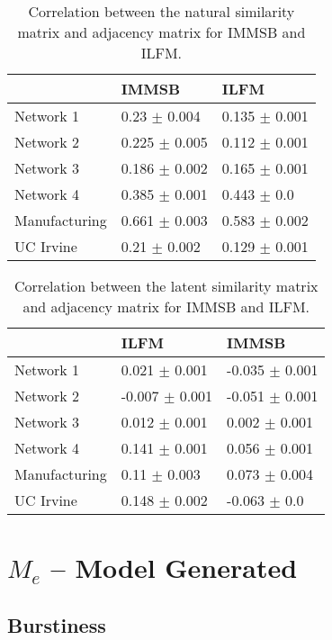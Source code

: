 \documentclass[a4paper, 12pt]{article}
\begin{document}
\begin{table}
    \caption{Correlation between the natural similarity matrix and adjacency matrix for IMMSB and ILFM.}
\centering
    \begin{tabular}{lll}
    \hline
    & IMMSB   & ILFM  \\
    \hline
    Network 1     & 0.23 $\pm$ 0.004  & 0.135 $\pm$ 0.001      \\
    Network 2     & 0.225 $\pm$ 0.005 & 0.112 $\pm$ 0.001      \\
    Network 3     & 0.186 $\pm$ 0.002 & 0.165 $\pm$ 0.001      \\
    Network 4     & 0.385 $\pm$ 0.001 & 0.443 $\pm$ 0.0        \\
    Manufacturing & 0.661 $\pm$ 0.003 & 0.583 $\pm$ 0.002      \\
    UC Irvine     & 0.21 $\pm$ 0.002  & 0.129 $\pm$ 0.001      \\
    \hline
    \end{tabular}
\end{table}


\begin{table}
    \caption{Correlation between the latent similarity matrix and adjacency matrix for IMMSB and ILFM.}
    \begin{tabular}{lll}
    \hline
    & ILFM  & IMMSB \\
    \hline
    Network 1     & 0.021 $\pm$ 0.001  & -0.035 $\pm$ 0.001      \\
    Network 2     & -0.007 $\pm$ 0.001 & -0.051 $\pm$ 0.001      \\
    Network 3     & 0.012 $\pm$ 0.001  & 0.002 $\pm$ 0.001       \\
    Network 4     & 0.141 $\pm$ 0.001  & 0.056 $\pm$ 0.001       \\
    Manufacturing & 0.11 $\pm$ 0.003   & 0.073 $\pm$ 0.004       \\
    UC Irvine     & 0.148 $\pm$ 0.002  & -0.063 $\pm$ 0.0        \\
    \hline
    \end{tabular}
\end{table}




\section{$M_e$ -- Model Generated}
\label{sec:mgmg}

\subsection{Burstiness}
\end{document}
